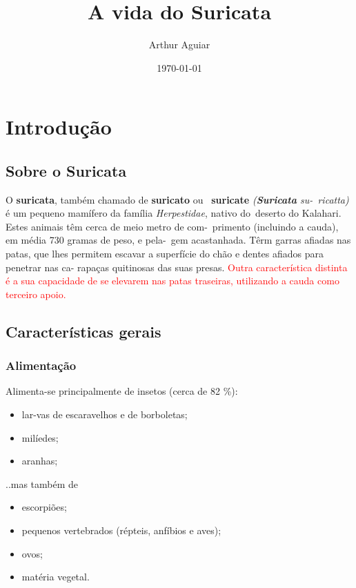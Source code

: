 \documentclass[a4paper,11pt]{report}
\title{A vida do Suricata}
\author{Arthur Aguiar}
\date {\today}
\begin{document}
\maketitle

\chapter{Introdução}

\section{Sobre o Suricata}
	O \textbf{suricata}, também chamado de  \textbf{suricato} ou \
	\textbf{suricate} \textit{(\textbf{Suricata} su-\
	ricatta)} é um pequeno mamífero da família \textit{Herpestidae}, nativo do\
	deserto do Kalahari. Estes animais têm cerca de meio metro de com-\
	primento (incluindo a cauda), em média 730 gramas de peso, e pela-\
	gem acastanhada. Têrm garras afiadas nas patas, que lhes permitem
	escavar a superfície do chão e dentes afiados para penetrar nas ca-
	rapaças quitinosas das suas presas. \textcolor{red}{Outra característica distinta é a sua capacidade de se elevarem nas patas traseiras, utilizando a cauda como terceiro apoio.}

\section{Características gerais}
\subsection{Alimentação}
	Alimenta-se principalmente de insetos (cerca de 82 \%):

	\begin{itemize}
		\item lar-vas de escaravelhos e de borboletas;
		\item milíedes;
		\item aranhas;
	\end{itemize}

..mas também de

	\begin{itemize}
		\item escorpiões;
		\item pequenos vertebrados (répteis, anfíbios e aves);
		\item ovos;
		\item matéria vegetal.
	\end{itemize}
\end{document}
